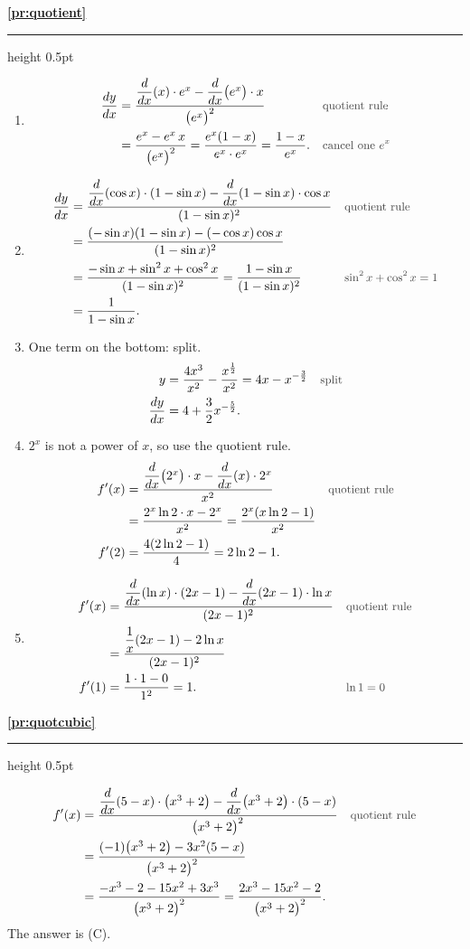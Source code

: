 \documentclass[11pt,a4paper]{article}
\newcommand{\solitem}[2]{%
 \par\addvspace{16pt}\Needspace{10\baselineskip}%
 {\large\bfseries \ref{#1}}\par\nobreak\vspace{2pt}%
 {\color{rulegray}\hrule height 0.5pt}\nobreak\vspace{7pt}%
 #2\par}
\newcommand{\why}[1]{\text{\small\color{darkgray}#1}}
\begin{document}
\solitem{pr:quotient}{%
\begin{enumerate}[label=(\alph*)]
 \item
 \begin{align*}
 \frac{dy}{dx}&=\frac{\dfrac{d}{dx}(x)\cdot e^x-\dfrac{d}{dx}\bigl(e^x\bigr)\cdot x}{\bigl(e^x\bigr)^2} &&\why{quotient rule}\\
 &=\frac{e^x-e^x\,x}{\bigl(e^x\bigr)^2}=\frac{e^x(1-x)}{e^x\cdot e^x}=\frac{1-x}{e^x}. &&\why{cancel one $e^x$}
 \end{align*}
 \item
 \begin{align*}
 \frac{dy}{dx}&=\frac{\dfrac{d}{dx}(\cos x)\cdot(1-\sin x)-\dfrac{d}{dx}(1-\sin x)\cdot\cos x}{(1-\sin x)^2} &&\why{quotient rule}\\
 &=\frac{(-\sin x)(1-\sin x)-(-\cos x)\cos x}{(1-\sin x)^2}\\
 &=\frac{-\sin x+\sin^2x+\cos^2x}{(1-\sin x)^2}=\frac{1-\sin x}{(1-\sin x)^2} &&\why{$\sin^2x+\cos^2x=1$}\\
 &=\frac{1}{1-\sin x}.
 \end{align*}
 \item One term on the bottom: split.
 \begin{align*}
 y&=\frac{4x^3}{x^2}-\frac{x^{\frac12}}{x^2}=4x-x^{-\frac32} &&\why{split}\\
 \frac{dy}{dx}&=4+\frac32x^{-\frac52}.
 \end{align*}
 \item $2^x$ is not a power of $x$, so use the quotient rule.
 \begin{align*}
 f'(x)&=\frac{\dfrac{d}{dx}\bigl(2^x\bigr)\cdot x-\dfrac{d}{dx}(x)\cdot2^x}{x^2} &&\why{quotient rule}\\
 &=\frac{2^x\ln2\cdot x-2^x}{x^2}=\frac{2^x(x\ln2-1)}{x^2}\\
 f'(2)&=\frac{4(2\ln2-1)}{4}=2\ln2-1.
 \end{align*}
 \item
 \begin{align*}
 f'(x)&=\frac{\dfrac{d}{dx}(\ln x)\cdot(2x-1)-\dfrac{d}{dx}(2x-1)\cdot\ln x}{(2x-1)^2} &&\why{quotient rule}\\
 &=\frac{\dfrac1x(2x-1)-2\ln x}{(2x-1)^2}\\
 f'(1)&=\frac{1\cdot1-0}{1^2}=1. &&\why{$\ln1=0$}
 \end{align*}
\end{enumerate}
}

\solitem{pr:quotcubic}{%
\begin{align*}
f'(x)&=\frac{\dfrac{d}{dx}(5-x)\cdot\bigl(x^3+2\bigr)-\dfrac{d}{dx}\bigl(x^3+2\bigr)\cdot(5-x)}{\bigl(x^3+2\bigr)^2} &&\why{quotient rule}\\
&=\frac{(-1)\bigl(x^3+2\bigr)-3x^2(5-x)}{\bigl(x^3+2\bigr)^2}\\
&=\frac{-x^3-2-15x^2+3x^3}{\bigl(x^3+2\bigr)^2}=\frac{2x^3-15x^2-2}{\bigl(x^3+2\bigr)^2}.
\end{align*}
The answer is (C).
}
\end{document}
